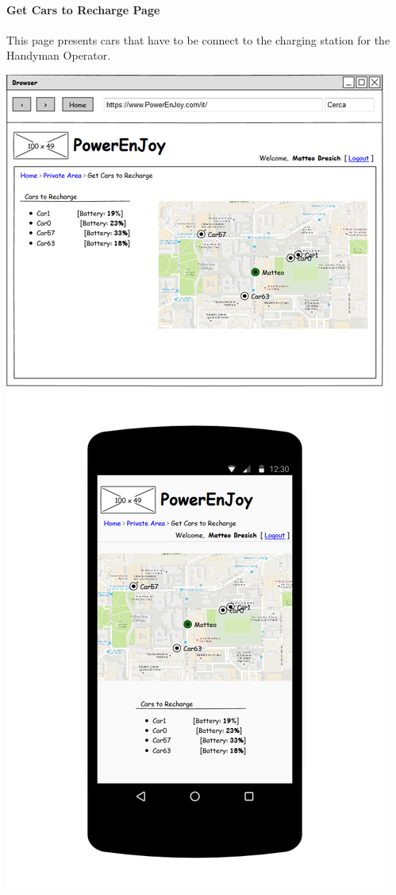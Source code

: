 \paragraph{Get Cars to Recharge Page} This page presents cars that have to be connect to the charging station for the Handyman Operator.
\begin{center}
	\includegraphics[width=0.6\linewidth]{"img/ui/get-cars-recharge"}
\end{center}
\pagebreak

